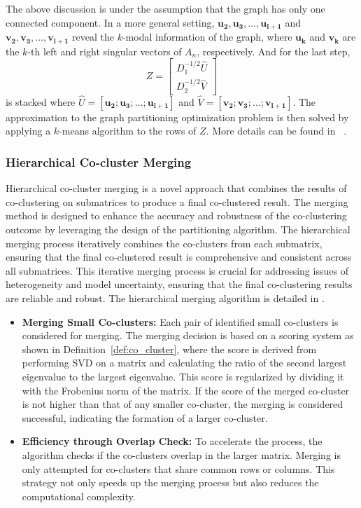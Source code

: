 \documentclass[journal]{IEEEtran}
\renewcommand{\cite}[1]{~\autocite{#1}}
\begin{document}
The above discussion is under the assumption that the graph has only one connected component. In a more general setting, $\mathbf{u_2}, \mathbf{u_3}, \ldots, \mathbf{u_{l+1}}$ and $\mathbf{v_2}, \mathbf{v_3}, \ldots, \mathbf{v_{l+1}}$ reveal the $k$-modal information of the graph, where $\mathbf{u_k}$ and $\mathbf{v_k}$ are the $k$-th left and right singular vectors of $A_n$, respectively. And for the last step,
$$ Z = \begin{bmatrix} D_1^{-1/2} \hat{U} \\ D_2^{-1/2} \hat{V} \end{bmatrix} $$
is stacked where $\hat{U} = [\mathbf{u_2}; \mathbf{u_3}; \ldots; \mathbf{u_{l+1}}]$ and $\hat{V} = [\mathbf{v_2}; \mathbf{v_3}; \ldots; \mathbf{v_{l+1}}]$. The approximation to the graph partitioning optimization problem is then solved by applying a $k$-means algorithm to the rows of $Z$. More details can be found in \cite{dhillon2001CoclusteringDocumentsWords}.

\subsubsection{Hierarchical Co-cluster Merging}

Hierarchical co-cluster merging is a novel approach that combines the results of co-clustering on submatrices to produce a final co-clustered result. The merging method is designed to enhance the accuracy and robustness of the co-clustering outcome by leveraging the design of the partitioning algorithm. The hierarchical merging process iteratively combines the co-clusters from each submatrix, ensuring that the final co-clustered result is comprehensive and consistent across all submatrices. This iterative merging process is crucial for addressing issues of heterogeneity and model uncertainty, ensuring that the final co-clustering results are reliable and robust. The hierarchical merging algorithm is detailed in .

\begin{itemize}
  \item \textbf{Merging Small Co-clusters:} Each pair of identified small co-clusters is considered for merging. The merging decision is based on a scoring system as shown in Definition~\ref{def:co_cluster}, where the score is derived from performing SVD on a matrix and calculating the ratio of the second largest eigenvalue to the largest eigenvalue. This score is regularized by dividing it with the Frobenius norm of the matrix. If the score of the merged co-cluster is not higher than that of any smaller co-cluster, the merging is considered successful, indicating the formation of a larger co-cluster.
  \item \textbf{Efficiency through Overlap Check:} To accelerate the process, the algorithm checks if the co-clusters overlap in the larger matrix. Merging is only attempted for co-clusters that share common rows or columns. This strategy not only speeds up the merging process but also reduces the computational complexity.
\end{itemize}
\end{document}
